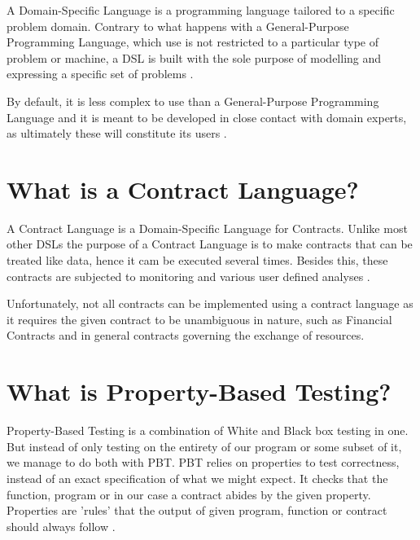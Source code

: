 \documentclass{ituthesis}
\begin{document}
A Domain-Specific Language is a programming language tailored to a specific problem domain. Contrary to what happens with a General-Purpose Programming Language, which use is not restricted to a particular type of problem or machine, a DSL is built with the sole purpose of modelling and expressing a specific set of problems \cite{van2000domain}.

By default, it is less complex to use than a General-Purpose Programming Language and it is meant to be developed in close contact with domain experts, as ultimately these will constitute its users \cite{dsl}.

\section{What is a Contract Language?}
A Contract Language is a Domain-Specific Language for Contracts. Unlike most other DSLs the purpose of a Contract Language is to make contracts that can be treated like data, hence it cam be executed several times. Besides this, these contracts are subjected to monitoring and various user defined analyses \cite{andersen2006compositional}.

Unfortunately, not all contracts can be implemented using a contract language as it requires the given contract to be unambiguous in nature, such as Financial Contracts and in general contracts governing the exchange of resources.


\section{What is Property-Based Testing?}
Property-Based Testing is a combination of White and Black box testing in one. But instead of only testing on the entirety of our program or some subset of it, we manage to do both with PBT. PBT relies on properties to test correctness, instead of an exact specification of what we might expect. It checks that the function, program or in our case a contract abides by the given property. Properties are 'rules' that the output of given program, function or contract should always follow \cite{fink1994towards}.
\end{document}
